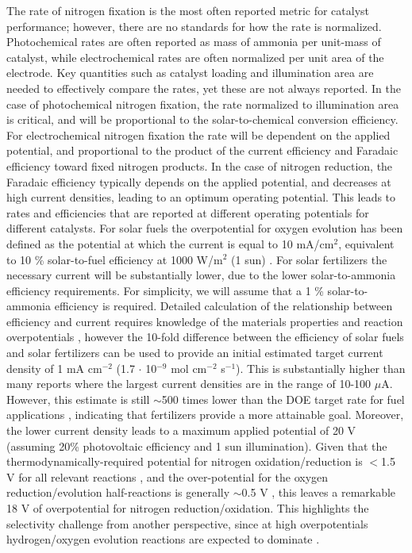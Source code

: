 The rate of nitrogen fixation is the most often reported metric for catalyst performance; however, there are no standards for how the rate is normalized. Photochemical rates are often reported as mass of ammonia per unit-mass of catalyst, while electrochemical rates are often normalized per unit area of the electrode. Key quantities such as catalyst loading and illumination area are needed to effectively compare the rates, yet these are not always reported. In the case of photochemical nitrogen fixation, the rate normalized to illumination area is critical, and will be proportional to the solar-to-chemical conversion efficiency. For electrochemical nitrogen fixation the rate will be dependent on the applied potential, and proportional to the product of the current efficiency and Faradaic efficiency toward fixed nitrogen products. In the case of nitrogen reduction, the Faradaic efficiency typically depends on the applied potential, and decreases at high current densities, leading to an optimum operating potential. This leads to rates and efficiencies that are reported at different operating potentials for different catalysts. For solar fuels the overpotential for oxygen evolution has been defined as the potential at which the current is equal to 10 mA/cm$^2$, equivalent to 10 \% solar-to-fuel efficiency at 1000 W/m$^2$ (1 sun) \cite{McCrory_2013}. For solar fertilizers the necessary current will be substantially lower, due to the lower solar-to-ammonia efficiency requirements. 
For simplicity, we will assume that a 1 \% solar-to-ammonia efficiency is required. Detailed calculation of the relationship between efficiency and current requires knowledge of the materials properties and reaction overpotentials \cite{Weber_1984,Pinaud_2013,Seitz_2014}, however the 10-fold difference between the efficiency of solar fuels and solar fertilizers can be used to provide an initial estimated target current density of 1 mA cm$^{-2}$ (1.7 $\cdot$ 10$^{-9}$ mol cm$^{-2}$ s$^{-1}$). 
This is substantially higher than many reports where the largest current densities are in the range of 10-100 $\mu$A. However, this estimate is still $\sim$500 times lower than the DOE target rate for fuel applications \cite{McPherson_2019}, indicating that fertilizers provide a more attainable goal. Moreover, the lower current density leads to a maximum applied potential of 20 V (assuming 20\% photovoltaic efficiency and 1 sun illumination). Given that the thermodynamically-required potential for nitrogen oxidation/reduction is $<$1.5 V for all relevant reactions \cite{Medford_2017}, and the over-potential for the oxygen reduction/evolution half-reactions is generally $\sim$0.5 V \cite{McCrory_2013,McCrory_2015}, this leaves a remarkable 18 V of overpotential for nitrogen reduction/oxidation. This highlights the selectivity challenge from another perspective, since at high overpotentials hydrogen/oxygen evolution reactions are expected to dominate \cite{Skulason_2012, Singh_2017}.

